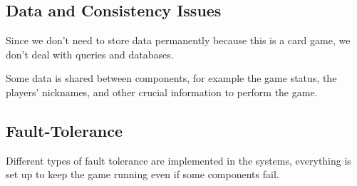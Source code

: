 \documentclass{scrartcl}
\begin{document}
\subsection{Data and Consistency Issues}\label{data-and-consistency-issues}

Since we don't need to store data permanently because this is a card game, we don't deal with queries 
and databases.

Some data is shared between components, for example the game status, the players' nicknames, and 
other crucial information to perform the game.

\subsection{Fault-Tolerance}\label{fault-tolerance}

Different types of fault tolerance are implemented in the systems, everything is set up to keep
the game running even if some components fail.
\end{document}
